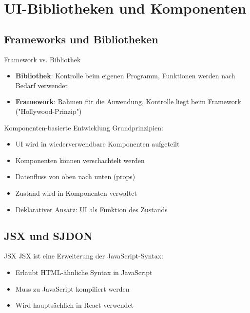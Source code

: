 \section{UI-Bibliotheken und Komponenten}

\subsection{Frameworks und Bibliotheken}

\begin{definition}{Framework vs. Bibliothek}
    \begin{itemize}
        \item \textbf{Bibliothek}: Kontrolle beim eigenen Programm, Funktionen werden nach Bedarf verwendet
        \item \textbf{Framework}: Rahmen für die Anwendung, Kontrolle liegt beim Framework ("Hollywood-Prinzip")
    \end{itemize}
\end{definition}

\begin{concept}{Komponenten-basierte Entwicklung}
    Grundprinzipien:
    \begin{itemize}
        \item UI wird in wiederverwendbare Komponenten aufgeteilt
        \item Komponenten können verschachtelt werden
        \item Datenfluss von oben nach unten (props)
        \item Zustand wird in Komponenten verwaltet
        \item Deklarativer Ansatz: UI als Funktion des Zustands
    \end{itemize}
\end{concept}

\subsection{JSX und SJDON}

\begin{definition}{JSX}
    JSX ist eine Erweiterung der JavaScript-Syntax:
    \begin{itemize}
        \item Erlaubt HTML-ähnliche Syntax in JavaScript
        \item Muss zu JavaScript kompiliert werden
        \item Wird hauptsächlich in React verwendet
    \end{itemize}
\end{definition}


